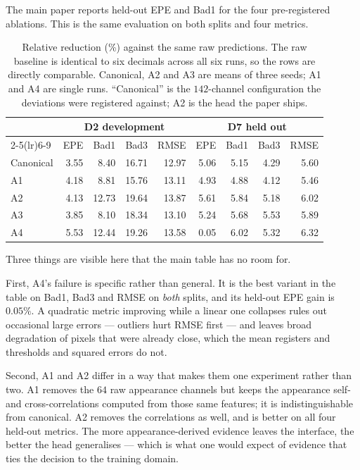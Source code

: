 \documentclass[letterpaper,10pt,conference]{ieeeconf}
\begin{document}
The main paper reports held-out EPE and Bad1 for the four pre-registered
ablations. This is the same evaluation on both splits and four metrics.

\begin{table}[!ht]
\centering
\caption{Relative reduction (\%) against the same raw predictions. The raw
baseline is identical to six decimals across all six runs, so the rows are
directly comparable. Canonical, A2 and A3 are means of three seeds; A1 and A4
are single runs. ``Canonical'' is the $142$-channel configuration the
deviations were registered against; A2 is the head the paper ships.}
\label{tab:ablations_full}
\setlength{\tabcolsep}{3pt}
\scriptsize
\begin{tabular}{@{}lrrrrrrrr@{}}
\toprule
& \multicolumn{4}{c}{D2 development} & \multicolumn{4}{c}{D7 held out} \\
\cmidrule(lr){2-5}\cmidrule(lr){6-9}
& EPE & Bad1 & Bad3 & RMSE & EPE & Bad1 & Bad3 & RMSE \\
\midrule
Canonical & 3.55 & 8.40 & 16.71 & 12.97 & 5.06 & 5.15 & 4.29 & 5.60 \\
A1 & 4.18 & 8.81 & 15.76 & 13.11 & 4.93 & 4.88 & 4.12 & 5.46 \\
A2 & 4.13 & 12.73 & 19.64 & 13.87 & 5.61 & 5.84 & 5.18 & 6.02 \\
A3 & 3.85 & 8.10 & 18.34 & 13.10 & 5.24 & 5.68 & 5.53 & 5.89 \\
A4 & 5.53 & 12.44 & 19.26 & 13.58 & 0.05 & 6.02 & 5.32 & 6.32 \\
\bottomrule
\end{tabular}
\end{table}

Three things are visible here that the main table has no room for.

First, A4's failure is specific rather than general. It is the best
variant in the table on Bad1, Bad3 and RMSE on \emph{both} splits, and
its held-out EPE gain is $0.05\%$. A quadratic metric improving while a
linear one collapses rules out occasional large errors --- outliers hurt
RMSE first --- and leaves broad degradation of pixels that were already
close, which the mean registers and thresholds and squared errors do not.

Second, A1 and A2 differ in a way that makes them one experiment rather
than two. A1 removes the $64$ raw appearance channels but keeps the
appearance self- and cross-correlations computed from those same
features; it is indistinguishable from canonical. A2 removes the
correlations as well, and is better on all four held-out metrics. The
more appearance-derived evidence leaves the interface, the better the
head generalises --- which is what one would expect of evidence that ties
the decision to the training domain.
\end{document}
